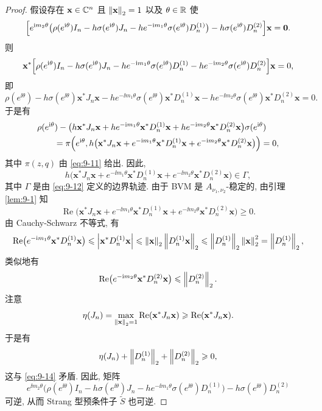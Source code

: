 \begin{proof}
假设存在 $\mathbf{x}\in\mathbb{C}^n$ 且 $\left\|\mathbf{x}\right\|_2=1$ 以及 $\theta\in\mathbb{R}$ 使
\[
  \Bigl[e^{\mathrm{i} m_2\theta}\bigl(\rho(e^{\mathrm{i}\theta})I_n-h\sigma(e^{\mathrm{i}\theta})J_n
  -he^{-\mathrm{i} m_1\theta}\sigma(e^{\mathrm{i}\theta})D_n^{(1)}\bigr)
  -h\sigma(e^{\mathrm{i}\theta})D_n^{(2)}\Bigr]\mathbf{x}=\mathbf{0}.
\]
则
\[
  \mathbf{x}^*\Bigl[\rho(e^{\mathrm{i}\theta})I_n-h\sigma(e^{\mathrm{i}\theta})J_n
  -he^{-\mathrm{i} m_1\theta}\sigma(e^{\mathrm{i}\theta})D_n^{(1)}
  -he^{-\mathrm{i} m_2\theta}\sigma(e^{\mathrm{i}\theta})D_n^{(2)}\Bigr]\mathbf{x}=0,
\]
即
\[
  \rho(e^{\ii\theta})-h\sigma(e^{\ii\theta})\mathbf{x}^*J_n\mathbf{x}
  -he^{-\ii m_1\theta}\sigma(e^{\ii\theta})\mathbf{x}^*D_n^{(1)}\mathbf{x}
  -he^{-\ii m_2\theta}\sigma(e^{\ii\theta})\mathbf{x}^*D_n^{(2)}\mathbf{x}=0.
\]
于是有
\[
  \begin{aligned}
    &\rho(e^{\mathrm{i}\theta})
    -\bigl(h\mathbf{x}^*J_n\mathbf{x}
      +he^{-\mathrm{i} m_1\theta}\mathbf{x}^*D_n^{(1)}\mathbf{x}
      +he^{-\mathrm{i} m_2\theta}\mathbf{x}^*D_n^{(2)}\mathbf{x}\bigr)\sigma(e^{\mathrm{i}\theta})\\
    &\qquad=\pi\Bigl(e^{\mathrm{i}\theta},
      h\bigl(\mathbf{x}^*J_n\mathbf{x}+e^{-\mathrm{i} m_1\theta}\mathbf{x}^*D_n^{(1)}\mathbf{x}
      +e^{-\mathrm{i} m_2\theta}\mathbf{x}^*D_n^{(2)}\mathbf{x}\bigr)\Bigr)=0,
  \end{aligned}
\]
其中 $\pi(z,q)$ 由 \eqref{eq:9-11} 给出. 因此,
\[
  h\bigl(\mathbf{x}^*J_n\mathbf{x}+e^{-\ii m_1\theta}\mathbf{x}^*D_n^{(1)}\mathbf{x}
  +e^{-\ii m_2\theta}\mathbf{x}^*D_n^{(2)}\mathbf{x}\bigr)\in\Gamma,
\]
其中 $\Gamma$ 是由 \eqref{eq:9-12} 定义的边界轨迹. 由于 BVM 是 $A_{\nu_1,\nu_2}$-稳定的, 由引理 \ref{lem:9-1} 知
\[
  \operatorname{Re}\bigl(\mathbf{x}^*J_n\mathbf{x}
  +e^{-\ii m_1\theta}\mathbf{x}^*D_n^{(1)}\mathbf{x}
  +e^{-\ii m_2\theta}\mathbf{x}^*D_n^{(2)}\mathbf{x}\bigr)\geqslant0.
\]
由 Cauchy-Schwarz 不等式, 有
\[
  \operatorname{Re}\bigl(e^{-\mathrm{i} m_1\theta}\mathbf{x}^*D_n^{(1)}\mathbf{x}\bigr)
  \leqslant\left|\mathbf{x}^*D_n^{(1)}\mathbf{x}\right|
  \leqslant\left\|\mathbf{x}\right\|_2\left\|D_n^{(1)}\mathbf{x}\right\|_2
  \leqslant\left\|D_n^{(1)}\right\|_2\left\|\mathbf{x}\right\|_2^2
  =\left\|D_n^{(1)}\right\|_2,
\]
类似地有
\[
  \operatorname{Re}\bigl(e^{-\mathrm{i} m_2\theta}\mathbf{x}^*D_n^{(2)}\mathbf{x}\bigr)
  \leqslant\left\|D_n^{(2)}\right\|_2.
\]
注意
\[
  \eta(J_n)=\max_{\left\|\mathbf{x}\right\|_2=1}\operatorname{Re}(\mathbf{x}^*J_n\mathbf{x})
  \geqslant\operatorname{Re}(\mathbf{x}^*J_n\mathbf{x}).
\]
于是有
\[
  \eta(J_n)+\left\|D_n^{(1)}\right\|_2+\left\|D_n^{(2)}\right\|_2\geqslant0,
\]
这与 \eqref{eq:9-14} 矛盾. 因此, 矩阵
\[
  e^{\ii m_2\theta}\bigl(\rho(e^{\ii\theta})I_n-h\sigma(e^{\ii\theta})J_n
  -he^{-\ii m_1\theta}\sigma(e^{\ii\theta})D_n^{(1)}\bigr)
  -h\sigma(e^{\ii\theta})D_n^{(2)}
\]
可逆, 从而 Strang 型预条件子 $\widetilde{S}$ 也可逆.
\end{proof}

